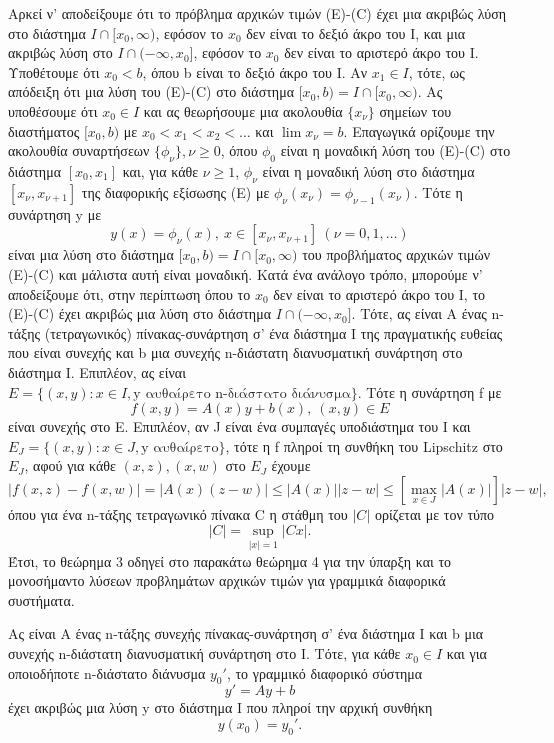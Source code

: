 \documentclass[11pt,a4paper,twoside]{book}
\newcommand{\titlefont}[1]{{\fontfamily{maksf}\selectfont #1}}
\newcounter{thewrhma}[chapter]
\renewcommand{\thethewrhma}{\thechapter.\arabic{thewrhma}}
\newcommand{\thewr}{\refstepcounter{thewrhma}{\bf\titlefont{\textcolor{secondarycolor}{\large Θεώρημα\hspace{2mm}\thethewrhma}}}\hspace{1mm}}{}
\newenvironment{Thewrhma}[1]
{\begin{tcolorbox}[title=\thewr\ \ :\ \  {\textcolor{black}{\bf{\large\titlefont{#1}}}},
breakable,
enhanced standard,
titlerule=-.2pt,
toprule=0pt, 
rightrule=0pt, 
bottomrule=0pt,
colback=white,
left=2mm,
top=1mm,
bottom=0mm,
boxrule=0pt,
colframe=white,
borderline west={1.5mm}{0pt}{secondarycolor},
leftrule=2mm,
sharp corners,
coltitle=secondarycolor]}
{\end{tcolorbox}}
\begin{document}
Αρκεί ν' αποδείξουμε ότι το πρόβλημα αρχικών τιμών (E)-(C) έχει μια ακριβώς λύση στο διάστημα $I \cap [x_0, \infty)$, εφόσον το $x_0$ δεν είναι το δεξιό άκρο του Ι, και μια ακριβώς λύση στο $I \cap (-\infty, x_0]$, εφόσον το $x_0$ δεν είναι το αριστερό άκρο του Ι. Υποθέτουμε ότι $x_0 < b$, όπου b είναι το δεξιό άκρο του Ι. Αν $x_1 \in I$, τότε, ως απόδειξη ότι μια λύση του (Ε)-(C) στο διάστημα $[x_0, b) = I \cap [x_0, \infty)$. Ας υποθέσουμε ότι $x_0 \in I$ και ας θεωρήσουμε μια ακολουθία $\{x_\nu\}$ σημείων του διαστήματος $[x_0, b)$ με $x_0 < x_1 < x_2 < \dots$ και $\lim x_\nu = b$. Επαγωγικά ορίζουμε την ακολουθία συναρτήσεων $\{\phi_\nu\}, \nu \ge 0$, όπου $\phi_0$ είναι η μοναδική λύση του (E)-(C) στο διάστημα $[x_0, x_1]$ και, για κάθε $\nu \ge 1$, $\phi_\nu$ είναι η μοναδική λύση στο διάστημα $[x_\nu, x_{\nu+1}]$ της διαφορικής εξίσωσης (Ε) με $\phi_\nu(x_\nu) = \phi_{\nu-1}(x_\nu)$. Τότε η συνάρτηση y με
\[
y(x) = \phi_\nu(x), \ x \in [x_\nu, x_{\nu+1}] \ (\nu=0,1,\dots)
\]
είναι μια λύση στο διάστημα $[x_0, b) = I \cap [x_0, \infty)$ του προβλήματος αρχικών τιμών (E)-(C) και μάλιστα αυτή είναι μοναδική. Κατά ένα ανάλογο τρόπο, μπορούμε ν' αποδείξουμε ότι, στην περίπτωση όπου το $x_0$ δεν είναι το αριστερό άκρο του Ι, το (Ε)-(C) έχει ακριβώς μια λύση στο διάστημα $I \cap (-\infty, x_0]$.
Τότε, ας είναι Α ένας n-τάξης (τετραγωνικός) πίνακας-συνάρτηση σ' ένα διάστημα Ι της πραγματικής ευθείας που είναι συνεχής και b μια συνεχής n-διάστατη διανυσματική συνάρτηση στο διάστημα Ι. Επιπλέον, ας είναι $E = \{(x,y) : x \in I, \text{y αυθαίρετο n-διάστατο διάνυσμα}\}$. Τότε η συνάρτηση f με
\[
f(x,y) = A(x)y+b(x), \ (x,y) \in E
\]
είναι συνεχής στο Ε. Επιπλέον, αν J είναι ένα συμπαγές υποδιάστημα του I και $E_J = \{(x,y) : x \in J, \text{y αυθαίρετο}\}$, τότε η f πληροί τη συνθήκη του Lipschitz στο $E_J$, αφού για κάθε $(x,z), (x,w)$ στο $E_J$ έχουμε
\[
|f(x,z)-f(x,w)| = |A(x)(z-w)| \le |A(x)||z-w| \le [\max_{x \in J}|A(x)|]|z-w|,
\]
όπου για ένα n-τάξης τετραγωνικό πίνακα C η στάθμη του $|C|$ ορίζεται με τον τύπο
\[
|C| = \sup_{|x|=1} |Cx|.
\]
Έτσι, το θεώρημα 3 οδηγεί στο παρακάτω θεώρημα 4 για την ύπαρξη και το μονοσήμαντο λύσεων προβλημάτων αρχικών τιμών για γραμμικά διαφορικά συστήματα.

\begin{Thewrhma}{}
Ας είναι Α ένας n-τάξης συνεχής πίνακας-συνάρτηση σ' ένα διάστημα Ι και b μια συνεχής n-διάστατη διανυσματική συνάρτηση στο Ι. Τότε, για κάθε $x_0 \in I$ και για οποιοδήποτε n-διάστατο διάνυσμα $y_0'$, το γραμμικό διαφορικό σύστημα
\[
y' = Ay+b
\]
έχει ακριβώς μια λύση y στο διάστημα Ι που πληροί την αρχική συνθήκη
\[
y(x_0) = y_0'.
\]
\end{Thewrhma}
\end{document}
